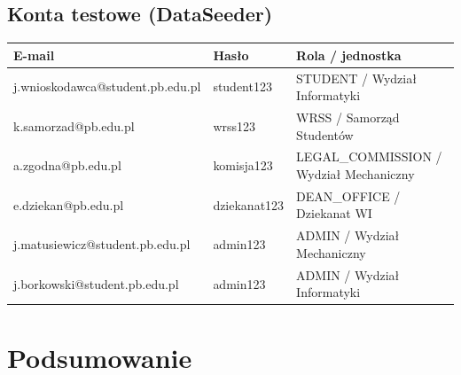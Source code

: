 \documentclass[12pt,a4paper]{article}
\begin{document}
\subsection{Konta testowe (DataSeeder)}
\begin{tabularx}{\textwidth}{l l X}
  \toprule
  \textbf{E-mail} & \textbf{Hasło} & \textbf{Rola / jednostka} \\
  \midrule
  j.wnioskodawca@student.pb.edu.pl & student123 & STUDENT / Wydział Informatyki \\
  k.samorzad@pb.edu.pl & wrss123 & WRSS / Samorząd Studentów \\
  a.zgodna@pb.edu.pl & komisja123 & LEGAL\_COMMISSION / Wydział Mechaniczny \\
  e.dziekan@pb.edu.pl & dziekanat123 & DEAN\_OFFICE / Dziekanat WI \\
  j.matusiewicz@student.pb.edu.pl & admin123 & ADMIN / Wydział Mechaniczny \\
  j.borkowski@student.pb.edu.pl & admin123 & ADMIN / Wydział Informatyki \\
  \bottomrule
\end{tabularx}

\section{Podsumowanie}
\label{sec:podsumowanie}

\end{document}
